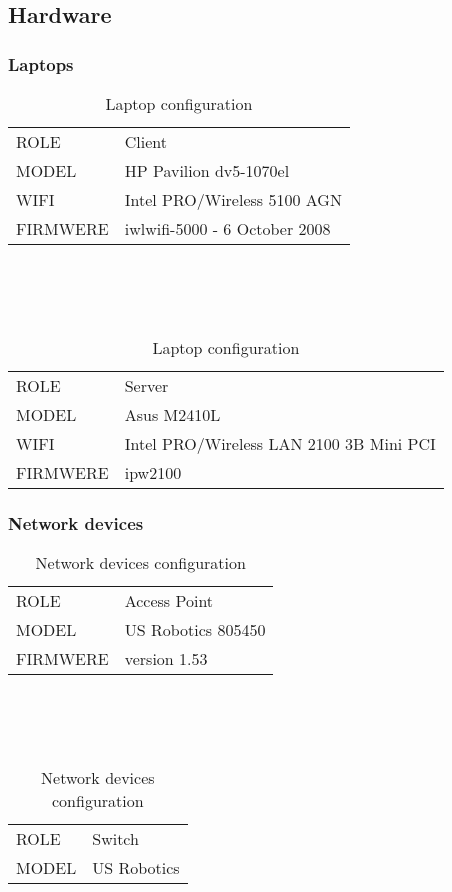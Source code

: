 \subsection{Hardware} \label{setup:hardware}

\subsubsection{Laptops}
	\begin{table}[h]
		
		\begin{tabularx}{15cm}{ | m{4cm} X | }
			\hline
				ROLE & Client\\
				MODEL & HP Pavilion dv5-1070el\\
				WIFI & Intel PRO/Wireless 5100 AGN\\
				FIRMWERE & iwlwifi-5000 - 6 October 2008\\
			\hline
		\end{tabularx}
		\\\\\\
		\begin{tabularx}{15cm}{ | m{4cm} X | }
			\hline
				ROLE & Server\\
				MODEL & Asus M2410L\\
				WIFI & Intel PRO/Wireless LAN 2100 3B Mini PCI\\
				FIRMWERE & ipw2100\\
			\hline
		\end{tabularx}
		
		\caption{Laptop configuration}
		\label{table1}
	\end{table}

\subsubsection{Network devices}
	\begin{table}[h]
		
		\begin{tabularx}{15cm}{ | m{4cm} X | }
			\hline
				ROLE & Access Point\\
				MODEL & US Robotics 805450\\
				FIRMWERE & version 1.53\\
			\hline
		\end{tabularx}
		\\\\\\
		\begin{tabularx}{15cm}{ | m{4cm} X | }
			\hline
				ROLE & Switch\\
				MODEL & US Robotics\\
			\hline
		\end{tabularx}
		
		\caption{Network devices configuration}
		\label{table2}
	\end{table}